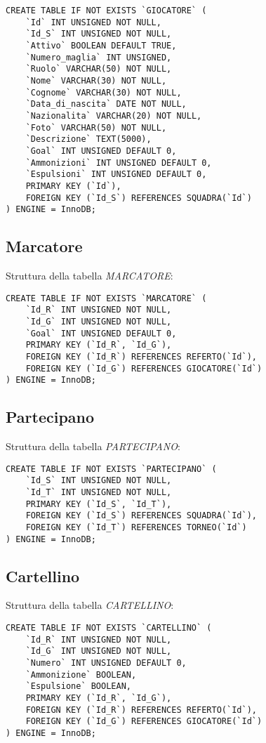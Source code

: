 \begin{lstlisting}
CREATE TABLE IF NOT EXISTS `GIOCATORE` (
	`Id` INT UNSIGNED NOT NULL,
	`Id_S` INT UNSIGNED NOT NULL,
	`Attivo` BOOLEAN DEFAULT TRUE,
	`Numero_maglia` INT UNSIGNED,
	`Ruolo` VARCHAR(50) NOT NULL,
	`Nome` VARCHAR(30) NOT NULL,
	`Cognome` VARCHAR(30) NOT NULL,
	`Data_di_nascita` DATE NOT NULL,
	`Nazionalita` VARCHAR(20) NOT NULL,
	`Foto` VARCHAR(50) NOT NULL,
	`Descrizione` TEXT(5000),
	`Goal` INT UNSIGNED DEFAULT 0,
	`Ammonizioni` INT UNSIGNED DEFAULT 0,
	`Espulsioni` INT UNSIGNED DEFAULT 0,
	PRIMARY KEY (`Id`),
	FOREIGN KEY (`Id_S`) REFERENCES SQUADRA(`Id`)
) ENGINE = InnoDB;
\end{lstlisting}

\newpage

\subsection{Marcatore}
Struttura della tabella \emph{MARCATORE}:

\begin{lstlisting}
CREATE TABLE IF NOT EXISTS `MARCATORE` (
	`Id_R` INT UNSIGNED NOT NULL,
	`Id_G` INT UNSIGNED NOT NULL,
	`Goal` INT UNSIGNED DEFAULT 0,
	PRIMARY KEY (`Id_R`, `Id_G`),
	FOREIGN KEY (`Id_R`) REFERENCES REFERTO(`Id`),
	FOREIGN KEY (`Id_G`) REFERENCES GIOCATORE(`Id`)
) ENGINE = InnoDB;
\end{lstlisting}

\subsection{Partecipano}
Struttura della tabella \emph{PARTECIPANO}:

\begin{lstlisting}
CREATE TABLE IF NOT EXISTS `PARTECIPANO` (
	`Id_S` INT UNSIGNED NOT NULL,
	`Id_T` INT UNSIGNED NOT NULL,
	PRIMARY KEY (`Id_S`, `Id_T`),
	FOREIGN KEY (`Id_S`) REFERENCES SQUADRA(`Id`),
	FOREIGN KEY (`Id_T`) REFERENCES TORNEO(`Id`)
) ENGINE = InnoDB;
\end{lstlisting}

\subsection{Cartellino}
Struttura della tabella \emph{CARTELLINO}:

\begin{lstlisting}
CREATE TABLE IF NOT EXISTS `CARTELLINO` (
	`Id_R` INT UNSIGNED NOT NULL,
	`Id_G` INT UNSIGNED NOT NULL,
	`Numero` INT UNSIGNED DEFAULT 0,
	`Ammonizione` BOOLEAN,
	`Espulsione` BOOLEAN,
	PRIMARY KEY (`Id_R`, `Id_G`),
	FOREIGN KEY (`Id_R`) REFERENCES REFERTO(`Id`),
	FOREIGN KEY (`Id_G`) REFERENCES GIOCATORE(`Id`)
) ENGINE = InnoDB;
\end{lstlisting}

